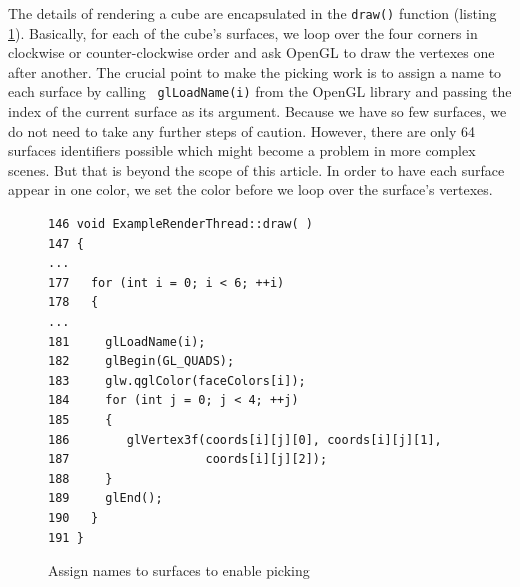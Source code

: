 \documentclass[jou,noapacite]{apa}
\begin{document}
The details of rendering a cube are encapsulated in the \lstinline|draw()|
function (listing \ref{lst:draw}).
%
Basically, for each of the cube's surfaces, we loop over the four corners in
clockwise or counter-clockwise order and ask OpenGL to draw the vertexes one
after another.
%
The crucial point to make the picking work is to assign a name to each surface
by calling \lstinline| glLoadName(i)| from the OpenGL library and
passing the index of the current surface as its argument.
%
Because we have so few surfaces, we do not need to take any further steps of
caution.
%
However, there are only 64 surfaces identifiers possible which might become a
problem in more complex scenes.
%
But that is beyond the scope of this article.
%
In order to have each surface appear in one color, we set the color before we
loop over the surface's vertexes.
\begin{figure}[h]
\begin{lstlisting}[basicstyle=\scriptsize]
146 void ExampleRenderThread::draw( )
147 {
...
177   for (int i = 0; i < 6; ++i)
178   {
...
181     glLoadName(i);
182     glBegin(GL_QUADS);
183     glw.qglColor(faceColors[i]);
184     for (int j = 0; j < 4; ++j)
185     {
186        glVertex3f(coords[i][j][0], coords[i][j][1],
187                   coords[i][j][2]);
188     }
189     glEnd();
190   }
191 }
\end{lstlisting}
\caption{Assign names to surfaces to enable picking}
\label{lst:draw}
\end{figure}
\end{document}
